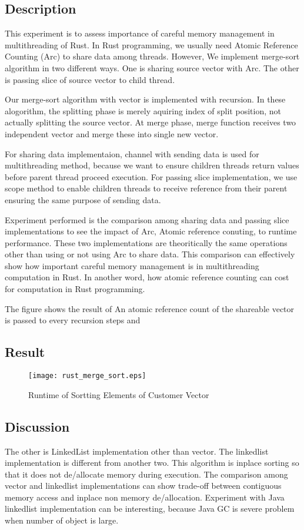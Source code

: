 \subsection{Description}
This experiment is to assess importance of careful memory management in multithreading of Rust. 
In Rust programming, we usually need Atomic Reference Counting (Arc) to share data among threads. 
However, 
We implement merge-sort algorithm in two different ways. One is sharing source vector with Arc. 
The other is passing slice of source vector to child thread. 

Our merge-sort algorithm with vector is implemented with recursion. In these alogorithm, the splitting phase is merely aquiring index of split position, 
not actually splitting the source vector. At merge phase, merge function receives two independent vector and merge these into single new vector.

For sharing data implementaion, channel with sending data is used for multithreading method, because we want to ensure children threads return values before parent thread proceed execution. 
For passing slice implementation, we use scope method to enable children threads to receive reference from their parent ensuring the same purpose of sending data. 

Experiment performed is the comparison among sharing data and passing slice implementations to see the impact of Arc, Atomic reference conuting, to runtime performance.
These two implementations are theoritically the same operations other than using or not using Arc to share data. 
This comparison can effectively show how important careful memory management is in multithreading computation in Rust. 
In another word, how atomic reference counting can cost for computation in Rust programming.

The figure shows the result of 
An atomic reference count of the shareable vector is passed to every recursion steps and 


\subsection{Result}

\begin{figure}[htb]
    \texttt{[image: rust\_merge\_sort.eps]}
    \caption{Runtime of Sortting Elements of Customer Vector}
    \label{fig:Sampling}
\end{figure}

\subsection{Discussion}


The other is LinkedList implementation other than vector.
The linkedlist implementation is different from another two. This algorithm is inplace sorting so that it does not de/allocate memory during execution. 
The comparison among vector and linkedlist implementations can show trade-off between contiguous memory access and inplace non memory de/allocation. 
Experiment with Java linkedlist implementation can be interesting, because Java GC is severe problem when number of object is large. 


